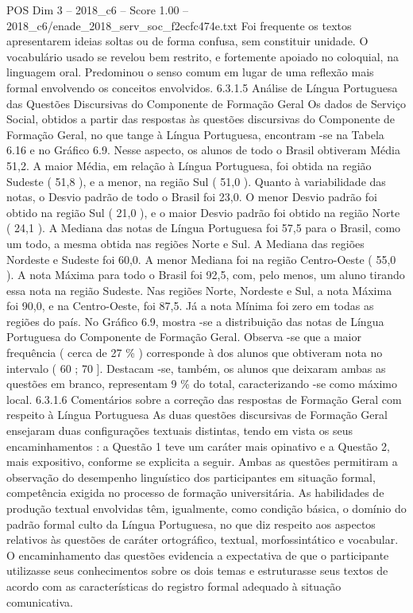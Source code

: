 \begin{textsample}{POS Dim 3 – 2018\_c6 – Score 1.00 – 2018\_c6/enade\_2018\_serv\_soc\_f2ecfc474e.txt}
Foi frequente os textos apresentarem ideias soltas ou de forma confusa, sem constituir unidade.
O vocabulário usado se revelou bem restrito, e fortemente apoiado no coloquial, na linguagem oral.
Predominou o senso comum em lugar de uma reflexão mais formal envolvendo os conceitos envolvidos. 6.3.1.5 Análise de Língua Portuguesa das Questões Discursivas do Componente de Formação Geral Os dados de Serviço Social, obtidos a partir das respostas às questões discursivas do Componente de Formação Geral, no que tange à Língua Portuguesa, encontram -se na Tabela 6.16 e no Gráfico 6.9.
Nesse aspecto, os alunos de todo o Brasil obtiveram Média 51,2.
A maior Média, em relação à Língua Portuguesa, foi obtida na região Sudeste ( 51,8 ), e a menor, na região Sul ( 51,0 ).
Quanto à variabilidade das notas, o Desvio padrão de todo o Brasil foi 23,0.
O menor Desvio padrão foi obtido na região Sul ( 21,0 ), e o maior Desvio padrão foi obtido na região Norte ( 24,1 ).
A Mediana das notas de Língua Portuguesa foi 57,5 para o Brasil, como um todo, a mesma obtida nas regiões Norte e Sul.
A Mediana das regiões Nordeste e Sudeste foi 60,0.
A menor Mediana foi na região Centro-Oeste ( 55,0 ).
A nota Máxima para todo o Brasil foi 92,5, com, pelo menos, um aluno tirando essa nota na região Sudeste.
Nas regiões Norte, Nordeste e Sul, a nota Máxima foi 90,0, e na Centro-Oeste, foi 87,5.
Já a nota Mínima foi zero em todas as regiões do país.
No Gráfico 6.9, mostra -se a distribuição das notas de Língua Portuguesa do Componente de Formação Geral.
Observa -se que a maior frequência ( cerca de 27 \% ) corresponde à dos alunos que obtiveram nota no intervalo ( 60 ; 70 ].
Destacam -se, também, os alunos que deixaram ambas as questões em branco, representam 9 \% do total, caracterizando -se como máximo local. 6.3.1.6 Comentários sobre a correção das respostas de Formação Geral com respeito à Língua Portuguesa As duas questões discursivas de Formação Geral ensejaram duas configurações textuais distintas, tendo em vista os seus encaminhamentos : a Questão 1 teve um caráter mais opinativo e a Questão 2, mais expositivo, conforme se explicita a seguir.
Ambas as questões permitiram a observação do desempenho linguístico dos participantes em situação formal, competência exigida no processo de formação universitária.
As habilidades de produção textual envolvidas têm, igualmente, como condição básica, o domínio do padrão formal culto da Língua Portuguesa, no que diz respeito aos aspectos relativos às questões de caráter ortográfico, textual, morfossintático e vocabular.
O encaminhamento das questões evidencia a expectativa de que o participante utilizasse seus conhecimentos sobre os dois temas e estruturasse seus textos de acordo com as características do registro formal adequado à situação comunicativa.

\end{textsample}
